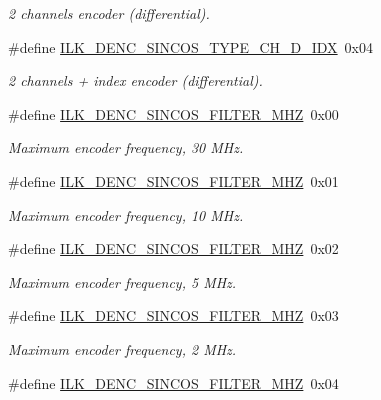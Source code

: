 \begin{DoxyCompactItemize}
\begin{DoxyCompactList}\small\item\em 2 channels encoder (differential). \end{DoxyCompactList}\item 
\#define \hyperlink{group__IL__CONST__DENC__SINCOS__PARAM_ga7a929c521c9237a8bd3a734f8ae068f3}{I\+L\+K\+\_\+\+D\+E\+N\+C\+\_\+\+S\+I\+N\+C\+O\+S\+\_\+\+T\+Y\+P\+E\+\_\+C\+H\+\_\+\+D\+\_\+\+I\+DX}~0x04
\begin{DoxyCompactList}\small\item\em 2 channels + index encoder (differential). \end{DoxyCompactList}\item 
\#define \hyperlink{group__IL__CONST__DENC__SINCOS__PARAM_gaa67a33025988b8d085baeb0804770837}{I\+L\+K\+\_\+\+D\+E\+N\+C\+\_\+\+S\+I\+N\+C\+O\+S\+\_\+\+F\+I\+L\+T\+E\+R\+\_\+M\+HZ}~0x00
\begin{DoxyCompactList}\small\item\em Maximum encoder frequency, 30 M\+Hz. \end{DoxyCompactList}\item 
\#define \hyperlink{group__IL__CONST__DENC__SINCOS__PARAM_ga2aec5b9498641698044e780eaecca09c}{I\+L\+K\+\_\+\+D\+E\+N\+C\+\_\+\+S\+I\+N\+C\+O\+S\+\_\+\+F\+I\+L\+T\+E\+R\+\_\+M\+HZ}~0x01
\begin{DoxyCompactList}\small\item\em Maximum encoder frequency, 10 M\+Hz. \end{DoxyCompactList}\item 
\#define \hyperlink{group__IL__CONST__DENC__SINCOS__PARAM_ga8bf6bb5fbc1f27e1fcd97c7450893cfc}{I\+L\+K\+\_\+\+D\+E\+N\+C\+\_\+\+S\+I\+N\+C\+O\+S\+\_\+\+F\+I\+L\+T\+E\+R\+\_\+M\+HZ}~0x02
\begin{DoxyCompactList}\small\item\em Maximum encoder frequency, 5 M\+Hz. \end{DoxyCompactList}\item 
\#define \hyperlink{group__IL__CONST__DENC__SINCOS__PARAM_ga89c1fe515b90e1d16bd7270c189e0e45}{I\+L\+K\+\_\+\+D\+E\+N\+C\+\_\+\+S\+I\+N\+C\+O\+S\+\_\+\+F\+I\+L\+T\+E\+R\+\_\+M\+HZ}~0x03
\begin{DoxyCompactList}\small\item\em Maximum encoder frequency, 2 M\+Hz. \end{DoxyCompactList}\item 
\#define \hyperlink{group__IL__CONST__DENC__SINCOS__PARAM_gac266c211396c8281f25e50373b1d59c1}{I\+L\+K\+\_\+\+D\+E\+N\+C\+\_\+\+S\+I\+N\+C\+O\+S\+\_\+\+F\+I\+L\+T\+E\+R\+\_\+M\+HZ}~0x04

\end{DoxyCompactItemize}
